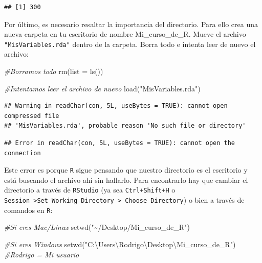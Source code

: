 \documentclass[
]{book}
\newenvironment{Shaded}{\begin{snugshade}}{\end{snugshade}}
\newcommand{\AttributeTok}[1]{\textcolor[rgb]{0.77,0.63,0.00}{#1}}
\newcommand{\CommentTok}[1]{\textcolor[rgb]{0.56,0.35,0.01}{\textit{#1}}}
\newcommand{\FunctionTok}[1]{\textcolor[rgb]{0.00,0.00,0.00}{#1}}
\newcommand{\NormalTok}[1]{#1}
\newcommand{\StringTok}[1]{\textcolor[rgb]{0.31,0.60,0.02}{#1}}
\begin{document}
\begin{verbatim}
## [1] 300
\end{verbatim}

Por último, es necesario resaltar la importancia del directorio. Para ello crea una nueva carpeta en tu escritorio de nombre Mi\_curso\_de\_R. Mueve el archivo \texttt{"MisVariables.rda"} dentro de la carpeta. Borra todo e intenta leer de nuevo el archivo:

\begin{Shaded}
\begin{Highlighting}[]
\CommentTok{\#Borramos todo}
\FunctionTok{rm}\NormalTok{(}\AttributeTok{list =} \FunctionTok{ls}\NormalTok{())}

\CommentTok{\#Intentamos leer el archivo de nuevo}
\FunctionTok{load}\NormalTok{(}\StringTok{"MisVariables.rda"}\NormalTok{)}
\end{Highlighting}
\end{Shaded}

\begin{verbatim}
## Warning in readChar(con, 5L, useBytes = TRUE): cannot open compressed file
## 'MisVariables.rda', probable reason 'No such file or directory'
\end{verbatim}

\begin{verbatim}
## Error in readChar(con, 5L, useBytes = TRUE): cannot open the connection
\end{verbatim}

Este error es porque \texttt{R} sigue pensando que nuestro directorio es el escritorio y está buscando el archivo ahí sin hallarlo. Para encontrarlo hay que cambiar el directorio a través de \texttt{RStudio} (ya sea \texttt{Ctrl+Shift+H} o \texttt{Session\ \textgreater{}Set\ Working\ Directory\ \textgreater{}\ Choose\ Directory}) o bien a través de comandos en \texttt{R}:

\begin{Shaded}
\begin{Highlighting}[]
\CommentTok{\#Si eres Mac/Linux}
\FunctionTok{setwd}\NormalTok{(}\StringTok{"\textasciitilde{}/Desktop/Mi\_curso\_de\_R"}\NormalTok{) }

\CommentTok{\#Si eres Windows}
\FunctionTok{setwd}\NormalTok{(}\StringTok{"C:\textbackslash{}Users\textbackslash{}Rodrigo\textbackslash{}Desktop\textbackslash{}Mi\_curso\_de\_R"}\NormalTok{) }\CommentTok{\#Rodrigo = Mi usuario}
\end{Highlighting}
\end{Shaded}
\end{document}
